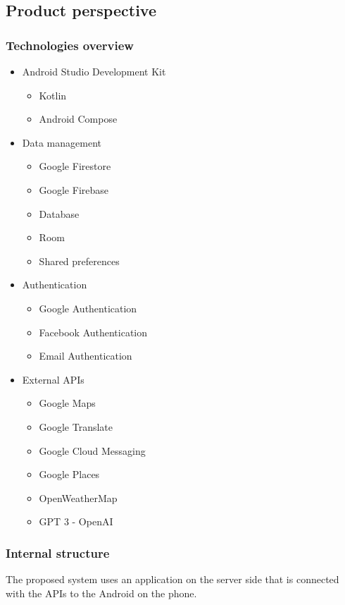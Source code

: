 \subsection{Product perspective}
\subsubsection{Technologies overview}
\begin{itemize}
\item Android Studio Development Kit
\begin{itemize}
\item Kotlin
\item Android Compose
\end{itemize}
\item Data management
\begin{itemize}
\item Google Firestore
\item Google Firebase
\item Database
\item Room
\item Shared preferences
\end{itemize}
\item Authentication
\begin{itemize}
\item Google Authentication
\item Facebook Authentication
\item Email Authentication
\end{itemize}
\item External APIs
\begin{itemize}
\item Google Maps
\item Google Translate
\item Google Cloud Messaging
\item Google Places
\item OpenWeatherMap
\item GPT 3 - OpenAI
\end{itemize}
\end{itemize}
\newpage
\subsubsection{Internal structure}
\hspace{\parindent}The proposed system uses an application on the server side that is connected with the APIs to the Android on the phone. 

